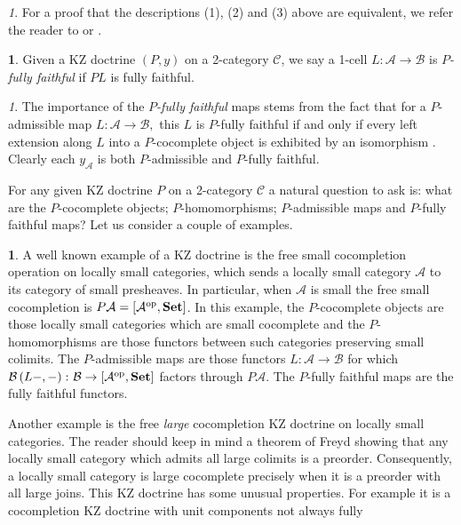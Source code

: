 \documentclass[a4paper,oneside,english]{amsart}
\numberwithin{equation}{section}
\numberwithin{figure}{section}
\theoremstyle{plain}
\theoremstyle{definition}
\newtheorem{defn}[thm]{\protect\definitionname}
\theoremstyle{remark}
\newtheorem{rem}[thm]{\protect\remarkname}
\theoremstyle{definition}
\newtheorem{example}[thm]{\protect\examplename}
\theoremstyle{plain}
\theoremstyle{plain}
\theoremstyle{plain}
\providecommand{\definitionname}{Definition}
\providecommand{\examplename}{Example}
\providecommand{\remarkname}{Remark}
\begin{document}
\begin{rem}
For a proof that the descriptions (1), (2) and (3) above are equivalent,
we refer the reader to \cite{bungefunk} or \cite{yonedakz}.\end{rem}
\begin{defn}
Given a KZ doctrine $\left(P,y\right)$ on a 2-category $\mathscr{C}$,
we say a 1-cell $L\colon\mathcal{A}\to\mathcal{B}$ is \emph{$P$-fully
faithful} if $PL$ is fully faithful.\end{defn}
\begin{rem}
The importance of the \emph{$P$-fully faithful }maps stems from the
fact that for a $P$-admissible map $L\colon\mathcal{A}\to\mathcal{B},$
this $L$ is $P$-fully faithful if and only if every left extension
along $L$ into a $P$-cocomplete object is exhibited by an isomorphism
\cite[Remark 24]{yonedakz}. Clearly each $y_{\mathcal{A}}$ is both
$P$-admissible and $P$-fully faithful.
\end{rem}
For any given KZ doctrine $P$ on a 2-category $\mathscr{C}$ a natural
question to ask is: what are the $P$-cocomplete objects; $P$-homomorphisms;
$P$-admissible maps and $P$-fully faithful maps? Let us consider
a couple of examples.
\begin{example}
A well known example of a KZ doctrine is the free small cocompletion
operation on locally small categories, which sends a locally small
category $\mathcal{A}$ to its category of small presheaves. In particular,
when $\mathcal{A}$ is small the free small cocompletion is $P\mathcal{A}=\left[\mathcal{A}^{\textnormal{op}},\mathbf{Set}\right]$.
In this example, the $P$-cocomplete objects are those locally small
categories which are small cocomplete and the $P$-homomorphisms are
those functors between such categories preserving small colimits.
The $P$-admissible maps are those functors $L\colon\mathcal{A}\to\mathcal{B}$
for which $\mathcal{B}\left(L-,-\right)\colon\mathcal{B}\to\left[\mathcal{A}^{\textnormal{op}},\mathbf{Set}\right]$
factors through $P\mathcal{A}$. The $P$-fully faithful maps are
the fully faithful functors.
\end{example}
Another example is the free \emph{large} cocompletion KZ doctrine
on locally small categories. The reader should keep in mind a theorem
of Freyd showing that any locally small category which admits all
large colimits is a preorder. Consequently, a locally small category
is large cocomplete precisely when it is a preorder with all large
joins. This KZ doctrine has some unusual properties. For example it
is a cocompletion KZ doctrine with unit components not always fully
\end{document}
